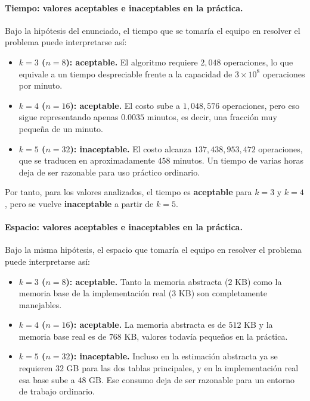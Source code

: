 \documentclass[12pt,a4paper]{article}
\begin{document}
\paragraph{Tiempo: valores aceptables e inaceptables en la pr\'actica.}
Bajo la hip\'otesis del enunciado, el tiempo que se tomar\'ia el equipo en resolver el problema puede interpretarse as\'i:
\begin{itemize}
  \item \textbf{\(k=3\) (\(n=8\)): aceptable.} El algoritmo requiere \(2{,}048\) operaciones, lo que equivale a un tiempo despreciable frente a la capacidad de \(3\times 10^8\) operaciones por minuto.
  \item \textbf{\(k=4\) (\(n=16\)): aceptable.} El costo sube a \(1{,}048{,}576\) operaciones, pero eso sigue representando apenas \(0.0035\) minutos, es decir, una fracci\'on muy peque\~na de un minuto.
  \item \textbf{\(k=5\) (\(n=32\)): inaceptable.} El costo alcanza \(137{,}438{,}953{,}472\) operaciones, que se traducen en aproximadamente \(458\) minutos. Un tiempo de varias horas deja de ser razonable para uso pr\'actico ordinario.
\end{itemize}

Por tanto, para los valores analizados, el tiempo es \textbf{aceptable} para \(k=3\) y \(k=4\), pero se vuelve \textbf{inaceptable} a partir de \(k=5\).

\paragraph{Espacio: valores aceptables e inaceptables en la pr\'actica.}
Bajo la misma hip\'otesis, el espacio que tomar\'ia el equipo en resolver el problema puede interpretarse as\'i:
\begin{itemize}
  \item \textbf{\(k=3\) (\(n=8\)): aceptable.} Tanto la memoria abstracta (\(2\) KB) como la memoria base de la implementaci\'on real (\(3\) KB) son completamente manejables.
  \item \textbf{\(k=4\) (\(n=16\)): aceptable.} La memoria abstracta es de \(512\) KB y la memoria base real es de \(768\) KB, valores todav\'ia peque\~nos en la pr\'actica.
  \item \textbf{\(k=5\) (\(n=32\)): inaceptable.} Incluso en la estimaci\'on abstracta ya se requieren \(32\) GB para las dos tablas principales, y en la implementaci\'on real esa base sube a \(48\) GB. Ese consumo deja de ser razonable para un entorno de trabajo ordinario.
\end{itemize}
\end{document}
